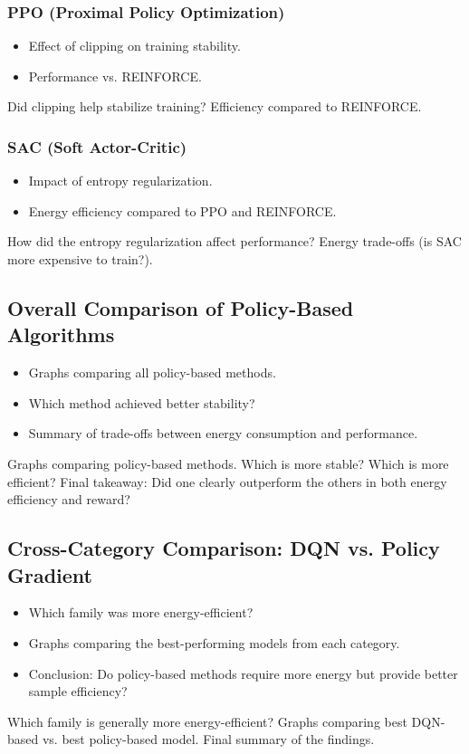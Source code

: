 \subsubsection{PPO (Proximal Policy Optimization)}
\begin{itemize}
	\item Effect of clipping on training stability.
	\item Performance vs. REINFORCE.
\end{itemize}
Did clipping help stabilize training?
Efficiency compared to REINFORCE.


\subsubsection{SAC (Soft Actor-Critic)}
\label{subsubsec:sac}
\begin{itemize}
	\item Impact of entropy regularization.
	\item Energy efficiency compared to PPO and REINFORCE.
\end{itemize}
How did the entropy regularization affect performance?
Energy trade-offs (is SAC more expensive to train?).


\subsection{Overall Comparison of Policy-Based Algorithms}
\begin{itemize}
	\item Graphs comparing all policy-based methods.
	\item Which method achieved better stability?
	\item Summary of trade-offs between energy consumption and performance.
\end{itemize}
Graphs comparing policy-based methods.
Which is more stable? Which is more efficient?
Final takeaway: Did one clearly outperform the others in both energy efficiency and reward?


\subsection{Cross-Category Comparison: DQN vs. Policy Gradient}
\begin{itemize}
	\item Which family was more energy-efficient?
	\item Graphs comparing the best-performing models from each category.
	\item Conclusion: Do policy-based methods require more energy but provide better sample efficiency?
\end{itemize}
Which family is generally more energy-efficient?
Graphs comparing best DQN-based vs. best policy-based model.
Final summary of the findings.